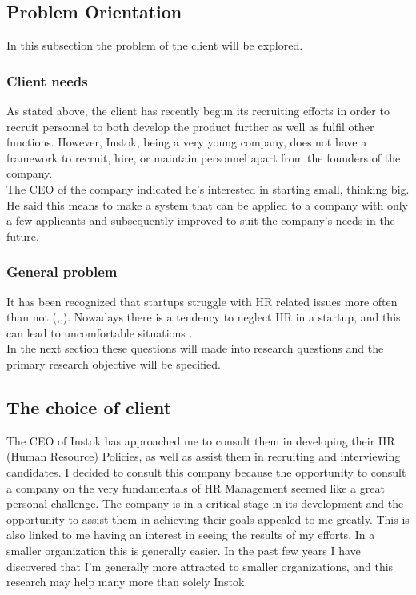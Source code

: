 \documentclass[man]{apa6}
\begin{document}
\subsection{Problem Orientation}
In this subsection the problem of the client will be explored.\\
\subsubsection{Client needs}
As stated above, the client has recently begun its recruiting efforts in order to recruit personnel to both develop the product further as well as fulfil other functions. However, Instok, being a very young company, does not have a framework to recruit, hire, or maintain personnel apart from the founders of the company. \\
The CEO of the company indicated he's interested in starting small, thinking big. He said this means to make a system that can be applied to a company with only a few applicants and subsequently improved to suit the company's needs in the future.

\subsubsection{General problem} It has been recognized that startups struggle with HR related issues more often than not (\parencite{FUNG2012},\parencite{WEISSMAN2016},\parencite{BUCH2016}). Nowadays there is a tendency to neglect HR in a startup, and this can lead to uncomfortable situations \parencite{WEISSMAN2016}.  \\
In the next section these questions will made into research questions and the primary research objective will be specified.

\subsection{The choice of client}
The CEO of Instok has approached me to consult them in developing their HR (Human Resource) Policies, as well as assist them in recruiting and interviewing candidates. I decided to consult this company because the opportunity to consult a company on the very fundamentals of HR Management seemed like a great personal challenge. The company is in a critical stage in its development and the opportunity to assist them in achieving their goals appealed to me greatly. This is also linked to me having an interest in seeing the results of my efforts. In a smaller organization this is generally easier. In the past few years I have discovered that I'm generally more attracted to smaller organizations, and this research may help many more than solely Instok.
\end{document}
